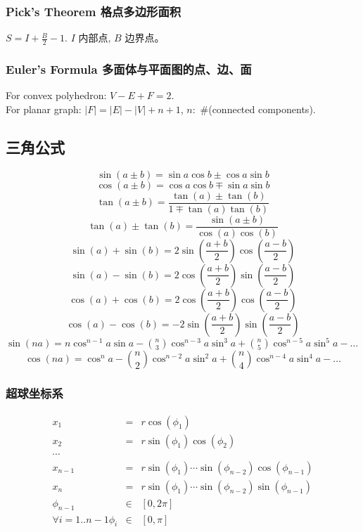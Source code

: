 \begin{small}
\begin{spacing}{0.5}
\subsubsection{Pick's Theorem 格点多边形面积}
$S=I+\frac{B}{2}-1.$ $I$ 内部点, $B$ 边界点。
\subsubsection{Euler's Formula 多面体与平面图的点、边、面}
For convex polyhedron: $V-E+F=2$. \\
For planar graph: $|F|=|E|-|V|+n+1$, $n:$ \#(connected components).
\subsection{三角公式}
\noindent
\[
\sin(a \pm b) = \sin a \cos b \pm \cos a \sin b
\]
\[
\cos(a \pm b) = \cos a \cos b \mp \sin a \sin b
\]
\[
\tan(a \pm b) = \frac{\tan(a)\pm\tan(b)}{1 \mp \tan(a)\tan(b)}
\]
\[
\tan(a) \pm \tan(b) = \frac{\sin(a \pm b)}{\cos(a)\cos(b)}
\]
\[
\sin(a) + \sin(b) = 2\sin(\frac{a + b}{2})\cos(\frac{a - b}{2})
\]
\[
\sin(a) - \sin(b) = 2\cos(\frac{a + b}{2})\sin(\frac{a - b}{2})
\]
\[
\cos(a) + \cos(b) = 2\cos(\frac{a + b}{2})\cos(\frac{a - b}{2})
\]
\[
\cos(a) - \cos(b) = -2\sin(\frac{a + b}{2})\sin(\frac{a - b}{2})
\]
$
\sin(na) = n\cos^{n-1}a\sin a - \binom{n}{3}\cos^{n-3}a \sin^3a + \binom{n}{5}\cos^{n-5}a\sin^5a - \dots
$
\[
\cos(na) = \cos^{n}a - \binom{n}{2}\cos^{n-2}a \sin^2a + \binom{n}{4}\cos^{n-4}a\sin^4a - \dots
\]
\subsubsection{超球坐标系}
\begin{eqnarray*}
 	x_1 &=& r\cos(\phi_1) \\ 
	x_2 &=& r\sin(\phi_1)\cos(\phi_2) \\
	\cdots\\
	x_{n-1} &=& r\sin(\phi_1)\cdots\sin(\phi_{n-2})\cos(\phi_{n-1}) \\
	x_n &=& r\sin(\phi_1)\cdots\sin(\phi_{n-2})\sin(\phi_{n-1}) \\
	\phi_{n-1} &\in& [0,2\pi]\\
	\forall {i=1..{n-1}}\phi_i &\in& [0,\pi]\\
\end{eqnarray*}

\end{spacing}
\end{small}
